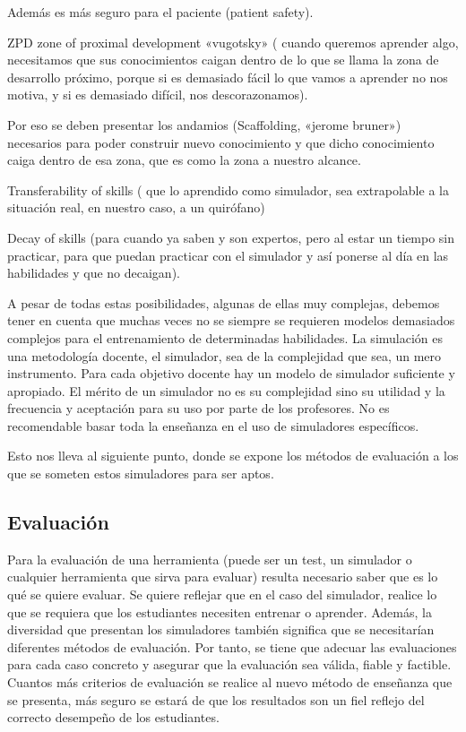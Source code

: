 Además es más seguro para el paciente (patient safety).

ZPD zone of proximal development «vugotsky» ( cuando queremos aprender algo, necesitamos que sus conocimientos caigan dentro de lo que se llama la zona de desarrollo próximo, porque si es demasiado fácil lo que vamos a aprender no nos motiva, y si es demasiado difícil, nos descorazonamos). 

Por eso se deben presentar los andamios (Scaffolding, «jerome bruner») necesarios para poder construir nuevo conocimiento y que dicho conocimiento caiga dentro de esa zona,  que es como la zona a nuestro alcance.

Transferability of skills ( que lo aprendido como simulador, sea extrapolable a la situación real, en nuestro caso, a un quirófano)

Decay of skills (para cuando ya saben y son expertos, pero al estar un tiempo sin practicar, para que puedan practicar con el simulador y así ponerse al día en las habilidades y que no decaigan).


A pesar de todas estas posibilidades, algunas de ellas muy complejas, debemos tener en cuenta que muchas veces no se siempre se requieren modelos demasiados complejos para el entrenamiento de determinadas habilidades. La simulación es una metodología docente, el simulador, sea de la complejidad que sea, un mero instrumento. Para cada objetivo docente hay un modelo de simulador suficiente y apropiado. El mérito de un simulador no es su complejidad sino su utilidad y la frecuencia y aceptación para su uso por parte de los profesores. No es recomendable basar toda la enseñanza en el uso de simuladores específicos.



Esto nos lleva al siguiente punto, donde se expone los métodos de evaluación a los que se someten estos simuladores para ser aptos.

\subsection{Evaluación}

Para la evaluación de una herramienta (puede ser un test, un simulador o cualquier herramienta que sirva para evaluar) resulta necesario saber que es lo qué se quiere evaluar. Se quiere reflejar que en el caso del simulador,  realice lo que se requiera que los estudiantes necesiten entrenar o aprender. Además, la diversidad que presentan los simuladores también significa que se necesitarían diferentes métodos de evaluación. Por tanto, se tiene que adecuar las evaluaciones para cada caso concreto y asegurar que la evaluación sea válida, fiable y factible. 
Cuantos más criterios de evaluación se realice al nuevo método de enseñanza que se presenta, más seguro se estará de que los resultados son un fiel reflejo del correcto desempeño de los estudiantes.

